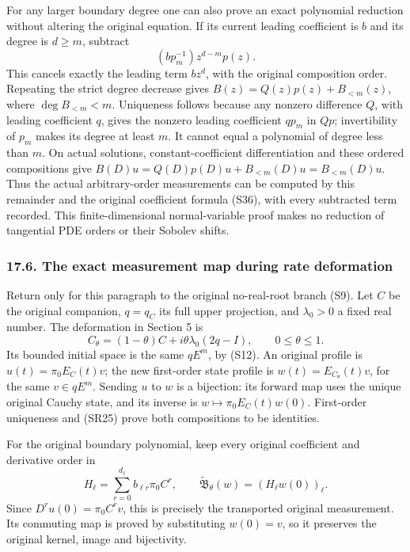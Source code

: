 \documentclass[
  11pt,
]{article}
\begin{document}
For any larger boundary degree one can also prove an exact polynomial
reduction without altering the original equation. If its current leading
coefficient is \(b\) and its degree is \(d\geq m\), subtract \[
 (b p_m^{-1})z^{d-m}p(z).
 \tag{SB23}
\] This cancels exactly the leading term \(bz^d\), with the original
composition order. Repeating the strict degree decrease gives
\(B(z)=Q(z)p(z)+B_{<m}(z)\), where \(\deg B_{<m}<m\). Uniqueness follows
because any nonzero difference \(Q\), with leading coefficient \(q\),
gives the nonzero leading coefficient \(q p_m\) in \(Qp\); invertibility
of \(p_m\) makes its degree at least \(m\). It cannot equal a polynomial
of degree less than \(m\). On actual solutions, constant-coefficient
differentiation and these ordered compositions give
\(B(D)u=Q(D)p(D)u+B_{<m}(D)u=B_{<m}(D)u\). Thus the actual
arbitrary-order measurements can be computed by this remainder and the
original coefficient formula (S36), with every subtracted term recorded.
This finite-dimensional normal-variable proof makes no reduction of
tangential PDE orders or their Sobolev shifts.

\subsubsection{17.6. The exact measurement map during rate
deformation}\label{the-exact-measurement-map-during-rate-deformation}

Return only for this paragraph to the original no-real-root branch (S9).
Let \(C\) be the original companion, \(q=q_C\) its full upper
projection, and \(\lambda_0>0\) a fixed real number. The deformation in
Section 5 is \[
 C_\theta=(1-\theta)C+i\theta\lambda_0(2q-I),
       \qquad0\leq\theta\leq1.
 \tag{SB24}
\] Its bounded initial space is the same \(qE^m\), by (S12). An original
profile is \(u(t)=\pi_0E_C(t)v\); the new first-order state profile is
\(w(t)=E_{C_\theta}(t)v\), for the same \(v\in qE^m\). Sending \(u\) to
\(w\) is a bijection: its forward map uses the unique original Cauchy
state, and its inverse is \(w\mapsto\pi_0E_C(t)w(0)\). First-order
uniqueness and (SR25) prove both compositions to be identities.

For the original boundary polynomial, keep every original coefficient
and derivative order in \[
 H_\ell=\sum_{r=0}^{d_\ell}b_{\ell r}\pi_0 C^r,
 \qquad\widetilde{\mathfrak B}_\theta(w)
                         =(H_\ell w(0))_\ell.
 \tag{SB25}
\] Since \(D^ru(0)=\pi_0C^rv\), this is precisely the transported
original measurement. Its commuting map is proved by substituting
\(w(0)=v\), so it preserves the original kernel, image and bijectivity.
\end{document}
